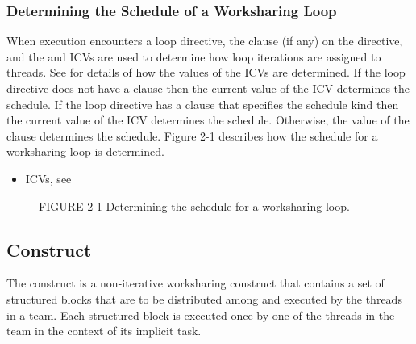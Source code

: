 \subsubsection{Determining the Schedule of a Worksharing Loop}
\label{subsubsec:Determining the Schedule of a Worksharing Loop}
When execution encounters a loop directive, the  clause (if any) on the 
directive, and the  and  ICVs are used to determine how loop 
iterations are assigned to threads. See 
for details of how the 
values of the ICVs are determined. If the loop directive does not have a  
clause then the current value of the \mbox{} ICV determines the schedule. If the 
loop directive has a  clause that specifies the  schedule kind then 
the current value of the  ICV determines the schedule. Otherwise, the 
value of the  clause determines the schedule. Figure 2-1 describes how the 
schedule for a worksharing loop is determined.
\crossreferences

\begin{itemize}
\item ICVs, see 
\end{itemize}


\begin{quote} %

\end{quote}

\begin{figure}[h]
{\textsc FIGURE 2-1} Determining the schedule for a worksharing loop.
\end{figure}










\subsection{ Construct}
\label{subsec:sections Construct}
\summary
The  construct is a non-iterative worksharing construct that contains a set of 
structured blocks that are to be distributed among and executed by the threads in a team. 
Each structured block is executed once by one of the threads in the team in the context 
of its implicit task.

